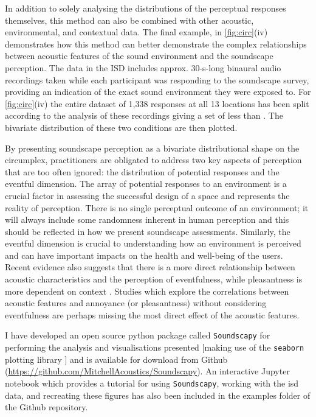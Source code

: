 In addition to solely analysing the distributions of the perceptual responses themselves, this method can also be combined with other acoustic, environmental, and contextual data. The final example, in \cref{fig:circ}(iv) demonstrates how this method can better demonstrate the complex relationships between acoustic features of the sound environment and the soundscape perception. The data in the ISD includes approx. 30-s-long binaural audio recordings taken while each participant was responding to the soundscape survey, providing an indication of the exact sound environment they were exposed to. For \cref{fig:circ}(iv) the entire dataset of 1,338 responses at all 13 locations has been split according to the analysis of these recordings giving a set of less than . The bivariate distribution of these two conditions are then plotted.

By presenting soundscape perception as a bivariate distributional shape on the circumplex, practitioners are obligated to address two key aspects of perception that are too often ignored: the distribution of potential responses and the eventful dimension. The array of potential responses to an environment is a crucial factor in assessing the successful design of a space and represents the reality of perception. There is no single perceptual outcome of an environment; it will always include some randomness inherent in human perception and this should be reflected in how we present soundscape assessments. Similarly, the eventful dimension is crucial to understanding how an environment is perceived and can have important impacts on the health and well-being of the users. Recent evidence also suggests that there is a more direct relationship between acoustic characteristics and the perception of eventfulness, while pleasantness is more dependent on context \citep{Mitchell2021Investigating}. Studies which explore the correlations between acoustic features and annoyance (or pleasantness) without considering eventfulness are perhaps missing the most direct effect of the acoustic features.

I have developed an open source python package called \texttt{Soundscapy} for performing the analysis and visualisations presented [making use of the \texttt{seaborn} plotting library \citep{Waskom2021seaborn}] and is available for download from Github (\url{https://github.com/MitchellAcoustics/Soundscapy}). An interactive Jupyter notebook which provides a tutorial for using \texttt{Soundscapy}, working with the \gls{isd} data, and recreating these figures has also been included in the examples folder of the Github repository.

